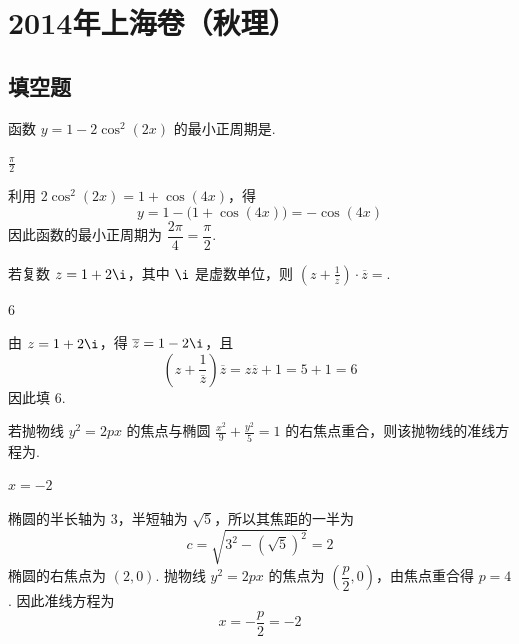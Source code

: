 \chapter{2014年上海卷（秋理）}

\section{填空题}

\begin{problem}
函数 \( y = 1 - 2\cos^2(2x) \) 的最小正周期是\fillinblank{}.
\end{problem}

\begin{answer}
\(\frac{\pi}{2}\)
\end{answer}

\begin{solution}
利用 \(2\cos^2(2x)=1+\cos(4x)\)，得
\[
y=1-\bigl(1+\cos(4x)\bigr)=-\cos(4x)
\]
因此函数的最小正周期为 \(\dfrac{2\pi}{4}=\dfrac{\pi}{2}\).
\end{solution}

\begin{problem}
若复数 \(z = 1 + 2\i\)，其中 \(\i\) 是虚数单位，则 \(\left(z + \frac{1}{\overline{z}}\right) \cdot \overline{z} =\)\fillinblank{}.
\end{problem}

\begin{answer}
\(6\)
\end{answer}

\begin{solution}
由 \(z=1+2\i\)，得 \(\overline{z}=1-2\i\)，且
\[
\left(z+\frac{1}{\overline z}\right)\overline z
=z\overline z+1=5+1=6
\]
因此填 \(6\).
\end{solution}

\begin{problem}
若抛物线 \( y^{2}=2px \) 的焦点与椭圆 \( \frac{x^{2}}{9}+\frac{y^{2}}{5}=1 \) 的右焦点重合，则该抛物线的准线方程为\fillinblank{}.
\end{problem}

\begin{answer}
\(x=-2\)
\end{answer}

\begin{solution}
椭圆的半长轴为 \(3\)，半短轴为 \(\sqrt5\)，所以其焦距的一半为
\[
c=\sqrt{3^2-(\sqrt5)^2}=2
\]
椭圆的右焦点为 \((2,0)\). 抛物线 \(y^2=2px\) 的焦点为 \(\left(\dfrac p2,0\right)\)，由焦点重合得 \(p=4\). 因此准线方程为
\[
x=-\frac p2=-2
\]
\end{solution}

